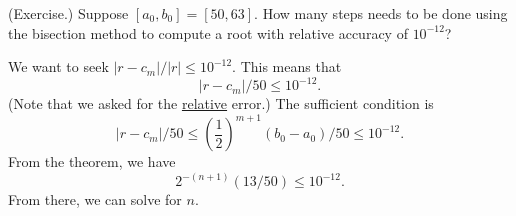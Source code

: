 \documentclass[letterpaper]{article}
\begin{document}
\begin{mdframed}[nobreak=true]
    (Exercise.) Suppose $[a_0, b_0] = [50, 63]$. How many steps needs to be done using the bisection method to compute a root with relative accuracy of $10^{-12}$? 

    \begin{mdframed}
        We want to seek $|r - c_m| / |r| \leq 10^{-12}$. This means that 
        \[|r - c_m| / 50 \leq 10^{-12}.\]
        (Note that we asked for the \underline{relative} error.) The sufficient condition is \[|r - c_m| / 50 \leq \left(\frac{1}{2}\right)^{m + 1} (b_0 - a_0) / 50 \leq 10^{-12}.\]
        From the theorem, we have 
        \[2^{-(n + 1)}(13 / 50) \leq 10^{-12}.\]
        From there, we can solve for $n$.
    \end{mdframed}
\end{mdframed}
\end{document}
